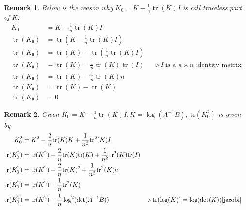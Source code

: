 \documentclass{article}
\theoremstyle{definition}
\theoremstyle{plain}
\newtheorem{remark}{Remark}
\begin{document}
\begin{remark}
Below is the reason why $K_0=K-\frac{1}{n}\operatorname{tr}(K)I$ is call traceless part of $K$:
\begin{align*}
    K_0&=K-\frac{1}{n}\operatorname{tr}(K)I\\
   \operatorname{tr}(K_0)&=\operatorname{tr}(K-\frac{1}{n}\operatorname{tr}(K)I)\\
   \operatorname{tr}(K_0)&=\operatorname{tr}(K)-\operatorname{tr}(\frac{1}{n}\operatorname{tr}(K)I)\\
   \operatorname{tr}(K_0)&=\operatorname{tr}(K)-\frac{1}{n}\operatorname{tr}(K)\operatorname{tr}(I)&&\triangleright I \text{ is a }n\times n \text{ identity matrix}\\
   \operatorname{tr}(K_0)&=\operatorname{tr}(K)-\frac{1}{n}\operatorname{tr}(K)n\\
   \operatorname{tr}(K_0)&=\operatorname{tr}(K)-\operatorname{tr}(K)\\
   \operatorname{tr}(K_0)&=0
\end{align*}
\end{remark}

\begin{remark}
Given $K_0=K-\frac{1}{n}\operatorname{tr}(K)I,K=\log{(A^{-1}B)}$, $\mathrm{tr}(K^2_0)$ is given by
\begin{align*}
    K_0^2&=K^2-\frac{2}{n}\mathrm{tr}(K)K+\frac{1}{n^2}\mathrm{tr}^2(K)I\\
    \mathrm{tr}(K^2_0)&=\mathrm{tr}(K^2)-\frac{2}{n}\mathrm{tr}(K)\mathrm{tr}(K)+\frac{1}{n^2}\mathrm{tr}^2(K)\mathrm{tr}(I)\\
    \mathrm{tr}(K^2_0)&=\mathrm{tr}(K^2)-\frac{2}{n}\mathrm{tr}(K)^2+\frac{1}{n^2}\mathrm{tr}^2(K)n\\
    \mathrm{tr}(K^2_0)&=\mathrm{tr}(K^2)-\frac{1}{n}\mathrm{tr}^2(K)\\
    \mathrm{tr}(K^2_0)&=\mathrm{tr}(K^2)-\frac{1}{n}\log^2(\det(A^{-1}B))&&\triangleright \mathrm{tr}(\log(K))=\log(\det(K))\cite{jacobi}
\end{align*}
\end{remark}
\end{document}

